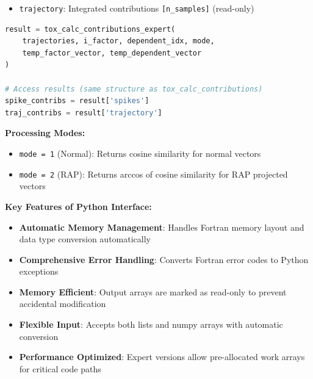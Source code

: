 \begin{enumerate}
\begin{itemize}
\begin{itemize}
                    \item \texttt{trajectory}: Integrated contributions \texttt{[n\_samples]}
                          (read-only)
                  \end{itemize}
          \end{itemize}
          \begin{lstlisting}[language=Python, caption={Expert Contributions Calculation with Work Arrays}]
result = tox_calc_contributions_expert(
    trajectories, i_factor, dependent_idx, mode, 
    temp_factor_vector, temp_dependent_vector
)

# Access results (same structure as tox_calc_contributions)
spike_contribs = result['spikes']
traj_contribs = result['trajectory']
          \end{lstlisting}
\end{enumerate}

\textbf{Processing Modes:}
\begin{itemize}
    \item \texttt{mode = 1} (Normal): Returns cosine similarity for normal vectors
          
    \item \texttt{mode = 2} (RAP): Returns arccos of cosine similarity for RAP projected
          vectors
\end{itemize}

\textbf{Key Features of Python Interface:}
\begin{itemize}
    \item \textbf{Automatic Memory Management}: Handles Fortran memory layout and
          data type conversion automatically
          
    \item \textbf{Comprehensive Error Handling}: Converts Fortran error codes to
          Python exceptions
          
    \item \textbf{Memory Efficient}: Output arrays are marked as read-only to prevent
          accidental modification
          
    \item \textbf{Flexible Input}: Accepts both lists and numpy arrays with automatic
          conversion
          
    \item \textbf{Performance Optimized}: Expert versions allow pre-allocated work
          arrays for critical code paths
\end{itemize}

